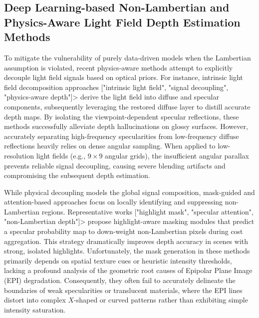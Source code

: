\documentclass[lettersize,journal]{IEEEtran}
\begin{document}
\subsection{Deep Learning-based Non-Lambertian and Physics-Aware Light Field Depth Estimation Methods}

To mitigate the vulnerability of purely data-driven models when the Lambertian assumption is violated, recent physics-aware methods attempt to explicitly decouple light field signals based on optical priors. For instance, intrinsic light field decomposition approaches ["intrinsic light field", "signal decoupling", "physics-aware depth"]> derive the light field into diffuse and specular components, subsequently leveraging the restored diffuse layer to distill accurate depth maps. By isolating the viewpoint-dependent specular reflections, these methods successfully alleviate depth hallucinations on glossy surfaces. However, accurately separating high-frequency specularities from low-frequency diffuse reflections heavily relies on dense angular sampling. When applied to low-resolution light fields (e.g., $9 \times 9$ angular grids), the insufficient angular parallax prevents reliable signal decoupling, causing severe blending artifacts and compromising the subsequent depth estimation.

While physical decoupling models the global signal composition, mask-guided and attention-based approaches focus on locally identifying and suppressing non-Lambertian regions. Representative works ["highlight mask", "specular attention", "non-Lambertian depth"]> propose highlight-aware masking modules that predict a specular probability map to down-weight non-Lambertian pixels during cost aggregation. This strategy dramatically improves depth accuracy in scenes with strong, isolated highlights. Unfortunately, the mask generation in these methods primarily depends on spatial texture cues or heuristic intensity thresholds, lacking a profound analysis of the geometric root causes of Epipolar Plane Image (EPI) degradation. Consequently, they often fail to accurately delineate the boundaries of weak specularities or translucent materials, where the EPI lines distort into complex $X$-shaped or curved patterns rather than exhibiting simple intensity saturation.
\end{document}
